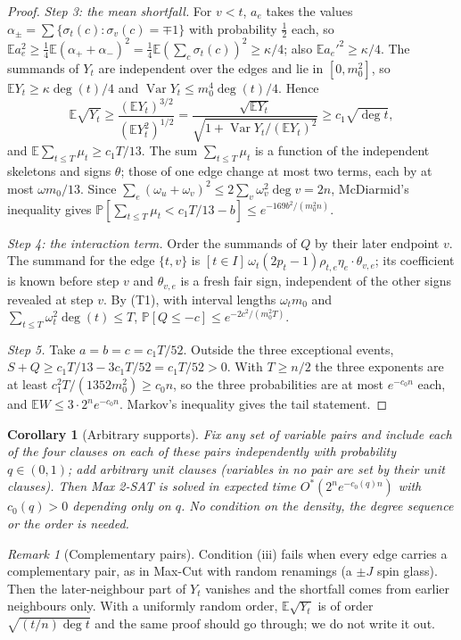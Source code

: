 \documentclass[11pt,a4paper]{article}
\newtheorem{corollary}[theorem]{Corollary}
\theoremstyle{definition}
\theoremstyle{remark}
\newtheorem{remark}[theorem]{Remark}
\newcommand{\Ostar}{O^{*}}
\newcommand{\E}{\mathbb E}
\newcommand{\Prb}{\mathbb P}
\begin{document}
\begin{proof}
\emph{Step 3: the mean shortfall.} For $v<t$, $a_e$ takes the values
$\alpha_\pm=\sum\{\sigma_t(c):\sigma_v(c)=\mp1\}$ with probability $\frac12$
each, so $\E a_e^2\ge\frac14\E(\alpha_++\alpha_-)^2
=\frac14\E(\sum_c\sigma_t(c))^2\ge\kappa/4$; also $\E a_e'^2\ge\kappa/4$. The
summands of $Y_t$ are independent over the edges and lie in $[0,m_0^2]$, so
$\E Y_t\ge\kappa\deg(t)/4$ and $\operatorname{Var}Y_t\le m_0^4\deg(t)/4$. Hence
\[
 \E\sqrt{Y_t}\ge\frac{(\E Y_t)^{3/2}}{(\E Y_t^2)^{1/2}}
 =\frac{\sqrt{\E Y_t}}{\sqrt{1+\operatorname{Var}Y_t/(\E Y_t)^2}}
 \ge c_1\sqrt{\deg t},
\]
and $\E\sum_{t\le T}\mu_t\ge c_1T/13$. The sum $\sum_{t\le T}\mu_t$ is a function
of the independent skeletons and signs $\theta$; those of one edge change at most
two terms, each by at most $\omega m_0/13$. Since $\sum_e(\omega_u+\omega_v)^2\le
2\sum_v\omega_v^2\deg v=2n$, McDiarmid's inequality gives
$\Prb[\sum_{t\le T}\mu_t<c_1T/13-b]\le e^{-169b^2/(m_0^2n)}$.

\emph{Step 4: the interaction term.} Order the summands of $Q$ by their later
endpoint $v$. The summand for the edge $\{t,v\}$ is
$[t\in I]\,\omega_t(2p_t-1)\rho_{t,e}\eta_e\cdot\theta_{v,e}$; its coefficient is
known before step $v$ and $\theta_{v,e}$ is a fresh fair sign, independent of the
other signs revealed at step $v$. By (T1), with interval lengths
$\omega_tm_0$ and $\sum_{t\le T}\omega_t^2\deg(t)\le T$,
$\Prb[Q\le-c]\le e^{-2c^2/(m_0^2T)}$.

\emph{Step 5.} Take $a=b=c=c_1T/52$. Outside the three exceptional events,
$S+Q\ge c_1T/13-3c_1T/52=c_1T/52>0$. With $T\ge n/2$ the three exponents are at
least $c_1^2T/(1352m_0^2)\ge c_0n$, so the three probabilities are at most
$e^{-c_0n}$ each, and
$\E W\le3\cdot2^ne^{-c_0n}$. Markov's inequality gives the tail statement.
\end{proof}

\begin{corollary}[Arbitrary supports]\label{cor:support}
Fix any set of variable pairs and include each of the four clauses on each of
these pairs independently with probability $q\in(0,1)$; add arbitrary unit
clauses (variables in no pair are set by their unit clauses). Then Max 2-SAT is solved in expected time $\Ostar(2^n e^{-c_0(q)n})$ with
$c_0(q)>0$ depending only on $q$. No condition on the density, the degree
sequence or the order is needed.
\end{corollary}

\begin{remark}[Complementary pairs]
Condition (iii) fails when every edge carries a complementary pair, as in Max-Cut
with random renamings (a $\pm J$ spin glass). Then the later-neighbour part of
$Y_t$ vanishes and the shortfall comes from earlier neighbours only. With a
uniformly random order, $\E\sqrt{Y_t}$ is of order $\sqrt{(t/n)\deg t}$ and the
same proof should go through; we do not write it out.
\end{remark}
\end{document}
